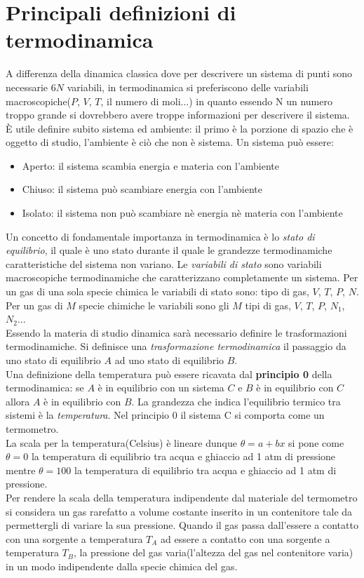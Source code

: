 \documentclass{article}
\begin{document}
\section{Principali definizioni di termodinamica}
A differenza della dinamica classica dove per descrivere un sistema di punti sono necessarie $6N$ variabili, in termodinamica si preferiscono delle variabili macroscopiche($P$, $V$, $T$, il numero di moli...) in quanto essendo N un numero troppo grande si dovrebbero avere troppe informazioni per descrivere il sistema. È utile definire subito sistema ed ambiente: il primo è la porzione di spazio che è oggetto di studio, l'ambiente è ciò che non è sistema. Un sistema può essere: \begin{itemize} \item Aperto: il sistema scambia energia e materia con l'ambiente
\item Chiuso: il sistema può scambiare energia con l'ambiente
\item Isolato: il sistema non può scambiare nè energia nè materia con l'ambiente
\end{itemize}
Un concetto di fondamentale importanza in termodinamica è lo \textit{stato di equilibrio}, il quale è uno stato durante il quale le grandezze termodinamiche caratteristiche del sistema non variano. Le \textit{variabili di stato} sono variabili macroscopiche termodinamiche che caratterizzano completamente un sistema. 
Per un gas di una sola specie chimica le variabili di stato sono: tipo di gas, $V$, $T$, $P$, $N$. Per un gas di $M$ specie chimiche le variabili sono gli $M$ tipi di gas, $V$, $T$, $P$, $N_1$, $N_2$...\\
Essendo la materia di studio dinamica sarà necessario definire le trasformazioni termodinamiche. Si definisce una \textit{trasformazione termodinamica} il passaggio da uno stato di equilibrio $A$ ad uno stato di equilibrio $B$. \\ Una definizione della temperatura può essere ricavata dal \textbf{principio 0} della termodinamica: se $A$ è in equilibrio con un sistema $C$ e $B$ è in equilibrio con $C$ allora $A$ è in equilibrio con $B$. La grandezza che indica l'equilibrio termico tra sistemi è la \textit{temperatura}. Nel principio 0 il sistema C si comporta come un termometro. \\ La scala per la temperatura(Celsius) è lineare dunque $\theta=a+bx$ si pone come $\theta=0$ la temperatura di equilibrio tra acqua e ghiaccio ad 1 atm di pressione mentre $\theta=100$ la temperatura di equilibrio tra acqua e ghiaccio ad 1 atm di pressione. \\ Per rendere la scala della temperatura indipendente dal materiale del termometro si considera un gas rarefatto a volume costante inserito in un contenitore tale da permettergli di variare la sua pressione. Quando il gas passa dall'essere a contatto con una sorgente a temperatura $T_A$ ad essere a contatto con una sorgente a temperatura $T_B$, la pressione del gas varia(l'altezza del gas nel contenitore varia) in un modo indipendente dalla specie chimica del gas.\\
\end{document}
